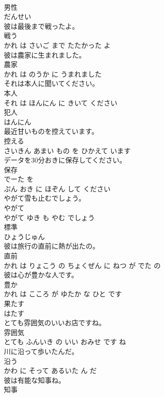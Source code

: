 \documentclass[8pt]{extreport}
\begin{document}
\begin{CJK}{UTF8}{min}
\\	男性	
\\	だんせい			
\\	彼は最後まで戦ったよ。	
\\	戦う 
\\	かれ は さいご まで たたかった よ			
\\	彼は農家に生まれました。	
\\	農家 
\\	かれ は のうか に うまれました			
\\	それは本人に聞いてください。	
\\	本人 
\\	それ は ほんにん に きいて ください			
\\	犯人	
\\	はんにん			
\\	最近甘いものを控えています。	
\\	控える 
\\	さいきん あまい もの を ひかえて います			
\\	データを30分おきに保存してください。	
\\	保存 
\\	でーた を 
\\	ぷん おき に ほぞん して ください			
\\	やがて雪も止むでしょう。	
\\	やがて 
\\	やがて ゆき も やむ でしょう			
\\	標準	
\\	ひょうじゅん			
\\	彼は旅行の直前に熱が出たの。	
\\	直前 
\\	かれ は りょこう の ちょくぜん に ねつ が でた の			
\\	彼は心が豊かな人です。	
\\	豊か 
\\	かれ は こころ が ゆたか な ひと です			
\\	果たす	
\\	はたす			
\\	とても雰囲気のいいお店ですね。	
\\	雰囲気 
\\	とても ふんいき の いい おみせ です ね			
\\	川に沿って歩いたんだ。	
\\	沿う 
\\	かわ に そって あるいた ん だ			
\\	彼は有能な知事ね。	
\\	知事 

\end{CJK}
\end{document}
